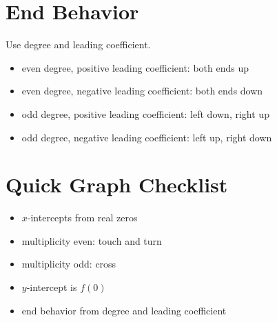 \documentclass[11pt]{article}
\begin{document}
\section*{End Behavior}
Use degree and leading coefficient.
\begin{itemize}
  \item even degree, positive leading coefficient: both ends up
  \item even degree, negative leading coefficient: both ends down
  \item odd degree, positive leading coefficient: left down, right up
  \item odd degree, negative leading coefficient: left up, right down
\end{itemize}

\section*{Quick Graph Checklist}
\begin{itemize}
  \item $x$-intercepts from real zeros
  \item multiplicity even: touch and turn
  \item multiplicity odd: cross
  \item $y$-intercept is $f(0)$
  \item end behavior from degree and leading coefficient
\end{itemize}
\end{document}
